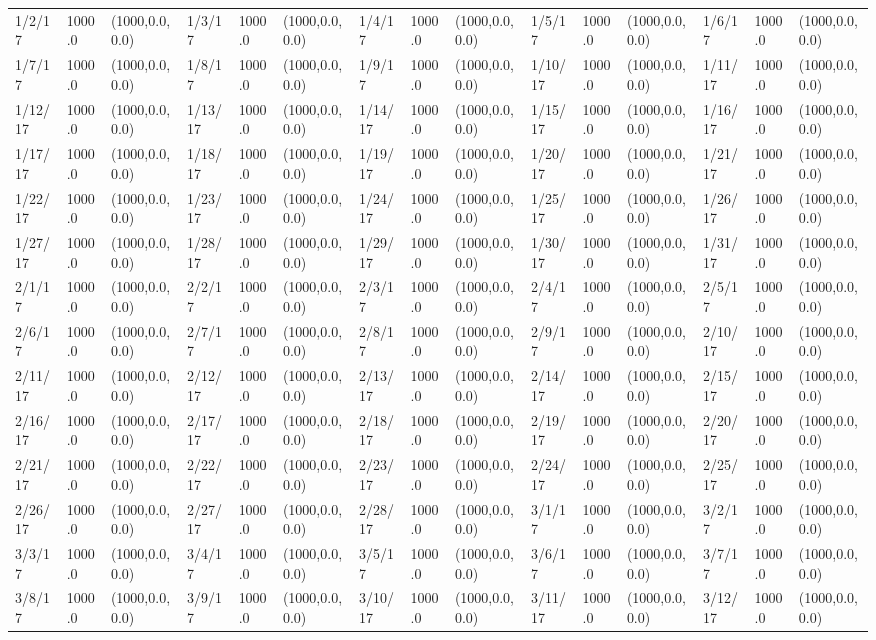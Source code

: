 \documentclass[12pt]{article}
\begin{document}
\begin{table}
\begin{center}
\begin{tabular}{p{15pt}p{15pt}p{25pt}p{15pt}p{15pt}p{25pt}p{15pt}p{15pt}p{25pt}p{15pt}p{15pt}p{25pt}p{15pt}p{15pt}p{25pt}}
    1/2/17&1000.0&(1000,0.0,0.0)&1/3/17&1000.0&(1000,0.0,0.0)&1/4/17&1000.0&(1000,0.0,0.0)&1/5/17&1000.0&(1000,0.0,0.0)&1/6/17&1000.0&(1000,0.0,0.0)\\
    1/7/17&1000.0&(1000,0.0,0.0)&1/8/17&1000.0&(1000,0.0,0.0)&1/9/17&1000.0&(1000,0.0,0.0)&1/10/17&1000.0&(1000,0.0,0.0)&1/11/17&1000.0&(1000,0.0,0.0)\\
    1/12/17&1000.0&(1000,0.0,0.0)&1/13/17&1000.0&(1000,0.0,0.0)&1/14/17&1000.0&(1000,0.0,0.0)&1/15/17&1000.0&(1000,0.0,0.0)&1/16/17&1000.0&(1000,0.0,0.0)\\
    1/17/17&1000.0&(1000,0.0,0.0)&1/18/17&1000.0&(1000,0.0,0.0)&1/19/17&1000.0&(1000,0.0,0.0)&1/20/17&1000.0&(1000,0.0,0.0)&1/21/17&1000.0&(1000,0.0,0.0)\\
    1/22/17&1000.0&(1000,0.0,0.0)&1/23/17&1000.0&(1000,0.0,0.0)&1/24/17&1000.0&(1000,0.0,0.0)&1/25/17&1000.0&(1000,0.0,0.0)&1/26/17&1000.0&(1000,0.0,0.0)\\
    1/27/17&1000.0&(1000,0.0,0.0)&1/28/17&1000.0&(1000,0.0,0.0)&1/29/17&1000.0&(1000,0.0,0.0)&1/30/17&1000.0&(1000,0.0,0.0)&1/31/17&1000.0&(1000,0.0,0.0)\\
    2/1/17&1000.0&(1000,0.0,0.0)&2/2/17&1000.0&(1000,0.0,0.0)&2/3/17&1000.0&(1000,0.0,0.0)&2/4/17&1000.0&(1000,0.0,0.0)&2/5/17&1000.0&(1000,0.0,0.0)\\
    2/6/17&1000.0&(1000,0.0,0.0)&2/7/17&1000.0&(1000,0.0,0.0)&2/8/17&1000.0&(1000,0.0,0.0)&2/9/17&1000.0&(1000,0.0,0.0)&2/10/17&1000.0&(1000,0.0,0.0)\\
    2/11/17&1000.0&(1000,0.0,0.0)&2/12/17&1000.0&(1000,0.0,0.0)&2/13/17&1000.0&(1000,0.0,0.0)&2/14/17&1000.0&(1000,0.0,0.0)&2/15/17&1000.0&(1000,0.0,0.0)\\
    2/16/17&1000.0&(1000,0.0,0.0)&2/17/17&1000.0&(1000,0.0,0.0)&2/18/17&1000.0&(1000,0.0,0.0)&2/19/17&1000.0&(1000,0.0,0.0)&2/20/17&1000.0&(1000,0.0,0.0)\\
    2/21/17&1000.0&(1000,0.0,0.0)&2/22/17&1000.0&(1000,0.0,0.0)&2/23/17&1000.0&(1000,0.0,0.0)&2/24/17&1000.0&(1000,0.0,0.0)&2/25/17&1000.0&(1000,0.0,0.0)\\
    2/26/17&1000.0&(1000,0.0,0.0)&2/27/17&1000.0&(1000,0.0,0.0)&2/28/17&1000.0&(1000,0.0,0.0)&3/1/17&1000.0&(1000,0.0,0.0)&3/2/17&1000.0&(1000,0.0,0.0)\\
    3/3/17&1000.0&(1000,0.0,0.0)&3/4/17&1000.0&(1000,0.0,0.0)&3/5/17&1000.0&(1000,0.0,0.0)&3/6/17&1000.0&(1000,0.0,0.0)&3/7/17&1000.0&(1000,0.0,0.0)\\
    3/8/17&1000.0&(1000,0.0,0.0)&3/9/17&1000.0&(1000,0.0,0.0)&3/10/17&1000.0&(1000,0.0,0.0)&3/11/17&1000.0&(1000,0.0,0.0)&3/12/17&1000.0&(1000,0.0,0.0)\\

\end{tabular}
\end{center}
\end{table}
\end{document}
